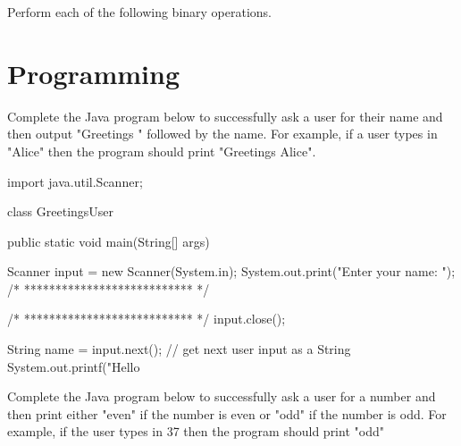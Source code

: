 \documentclass[answers,addpoints]{exam} %
\begin{document}
\begin{questions}
\question Perform each of the following binary operations.

\section{Programming}

\question[15] Complete the Java program below to successfully ask a user for their name and then output "Greetings " followed by the name. For example, if a user types in "Alice" then the program should print "Greetings Alice". 

\begin{code}
import java.util.Scanner;

class GreetingsUser {
    public static void main(String[] args) {
    	Scanner input = new Scanner(System.in);
	System.out.print("Enter your name: ");
   	/* *************************** */

 
 
 
 
 
 
 	/* *************************** */
 	input.close(); 
    }
}
\end{code}

\begin{solution}
\begin{code}
String name = input.next(); // get next user input as a String
System.out.printf("Hello %
\end{code}
\end{solution}

\question[15] Complete the Java program below to successfully ask a user for a number and then print either "even" if the number is even or "odd" if the number is odd. For example, if the user types in 37 then the program should print "odd"


\end{questions}
\end{document}
